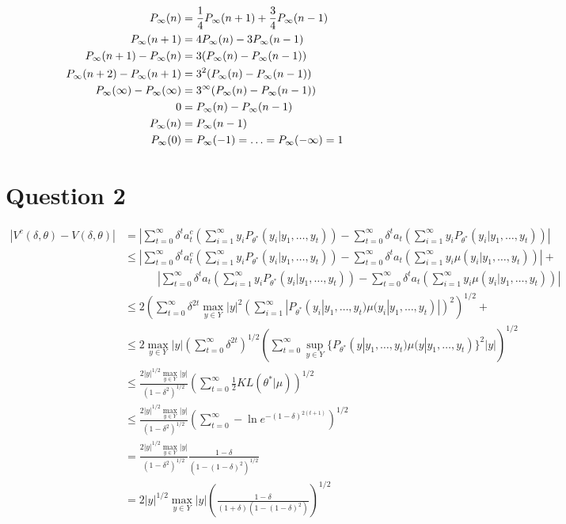 \documentclass{article}
\begin{document}
\[
\begin{split}
  P_{\infty}(n)            & = \frac{1}{4}P_{\infty}(n + 1) + \frac{3}{4}P_{\infty}(n - 1) \\
  P_{\infty}(n + 1)        & = 4P_{\infty}(n) - 3P_{\infty}(n-1) \\
  P_{\infty}(n + 1)-P_{\infty}(n) & = 3(P_{\infty}(n) - P_{\infty}(n-1)) \\
  P_{\infty}(n + 2)-P_{\infty}(n+1)&= 3^2(P_{\infty}(n) - P_{\infty}(n-1)) \\
  P_{\infty}(\infty)-P_{\infty}(\infty)&= 3^\infty(P_{\infty}(n) - P_{\infty}(n-1)) \\
  0                 & = P_{\infty}(n) - P_{\infty}(n-1) \\
  P_{\infty}(n)            & = P_{\infty}(n-1) \\
  P_{\infty}(0)            & = P_{\infty}(-1) = \ldots = P_{\infty}(-\infty) = 1 \\
\end{split}
\]


\section{Question 2}
\label{sec:Question 2}

\newcommand{\sumt}{\sum_{t=0}^\infty}
\newcommand{\sumi}{\sum_{i=1}^\infty}
\newcommand{\Pth}{P_{\theta^*}(y_i|y_1, \ldots, y_t)}
\newcommand{\muth}{\mu(y_i|y_1, \ldots, y_t)}
\newcommand{\maxy}{\max_{y \in Y} |y|}
\[
  \begin{split}
  |V^c(\delta, \theta) - V(\delta, \theta)| & = \left|
      \sumt \delta^t a^c_t \left(\sumi y_i \Pth\right) - 
          \sumt \delta^t a_t \left(\sumi y_i \Pth\right)
          \right| \\
    & \le \left|
        \sumt \delta^t a^c_t \left(\sumi y_i \Pth\right) - 
            \sumt \delta^t a_t \left(\sumi y_i \muth\right)
            \right| + \\ 
      & \qquad\quad \left|
        \sumt \delta^t a_t \left(\sumi y_i \Pth\right) - 
            \sumt \delta^t a_t \left(\sumi y_i \muth\right)
            \right| \\
    & \le 2\left(
        \sumt \delta^{2t} \maxy^2
            \left(\sumi |\Pth \muth|\right)^2\right)^{1/2} + \\
    & \le 2\maxy \left(\sumt \delta^{2t}\right)^{1/2} 
        \left(\sumt \sup_{y \in Y}\{
            P_{\theta^*}(y|y_1, \ldots, y_t)
            \mu(y|y_1, \ldots, y_t)\}^2 |y|\right)^{1/2} \\
    & \le \frac{2|y|^{1/2}\maxy}{(1 - \delta^2)^{1/2}} 
          \left(\sumt \frac{1}{2}KL(\theta^*|\mu)\right)^{1/2} \\
    & \le \frac{2|y|^{1/2}\maxy}{(1 - \delta^2)^{1/2}} 
          \left(\sumt -\ln e^{-(1 -\delta)^{2(t+1)}}\right)^{1/2} \\
    & = \frac{2|y|^{1/2}\maxy}{(1 - \delta^2)^{1/2}} 
          \frac{1 -\delta}{(1 - (1 - \delta)^2)^{1/2}} \\
    & = 2|y|^{1/2}\maxy
          \left(\frac{1 -\delta}{(1 + \delta)(1 - (1 - \delta)^2)}\right)^{1/2} \\
  \end{split}
\]
\end{document}
